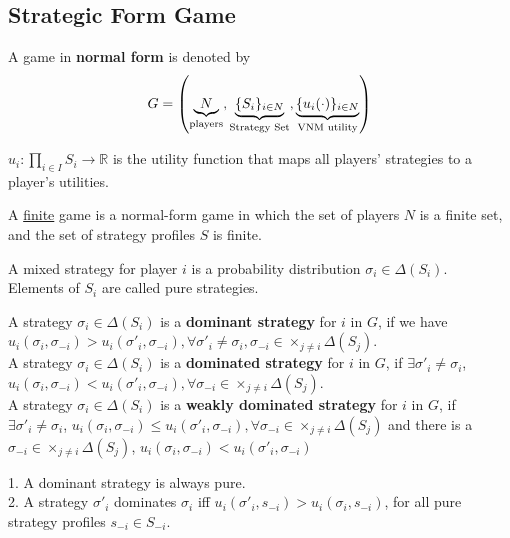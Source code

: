 \documentclass[11pt]{elegantbook_2}
\begin{document}
\subsection{Strategic Form Game}
\begin{definition}
    A game in \textbf{normal form} is denoted by $$G =\left(\underbrace{N}_{\textnormal{players}},\underbrace{\{S_i\}_{i\in N}}_{\textnormal{Strategy Set}},\underbrace{\{u_i(\cdot)\}_{i\in N}}_{\textnormal{VNM utility}}\right)$$

    $u_i:\prod_{i\in I}S_i \rightarrow \mathbb{R}$ is the utility function that maps all players' strategies to a player's utilities.

    A \underline{finite} game is a normal-form game in which the set of players $N$ is a finite set, and the set of strategy profiles $S$ is finite.
\end{definition}

\begin{definition}
A mixed strategy  for player $i$ is a probability distribution $\sigma_i\in\Delta(S_i)$.\\
Elements of $S_i$ are called pure strategies.
\end{definition}

\begin{definition}
    A strategy $\sigma_i\in \Delta(S_i)$ is a \textbf{dominant strategy} for $i$ in $G$, if we have $u_i(\sigma_i,\sigma_{-i})> u_i(\sigma'_i,\sigma_{-i}), \forall \sigma'_i\neq \sigma_i, \sigma_{-i}\in\times_{j\neq i}\Delta(S_j)$.\\
    A strategy $\sigma_i\in \Delta(S_i)$ is a \textbf{dominated strategy} for $i$ in $G$, if $\exists \sigma'_i\neq \sigma_i$, $u_i(\sigma_i,\sigma_{-i})<u_i(\sigma'_i,\sigma_{-i}), \forall \sigma_{-i}\in\times_{j\neq i}\Delta(S_j)$.\\
    A strategy $\sigma_i\in \Delta(S_i)$ is a \textbf{weakly dominated strategy} for $i$ in $G$, if $\exists \sigma'_i\neq \sigma_i$, $u_i(\sigma_i,\sigma_{-i})\leq u_i(\sigma'_i,\sigma_{-i}), \forall \sigma_{-i}\in\times_{j\neq i}\Delta(S_j)$ and there is a $\sigma_{-i}\in\times_{j\neq i}\Delta(S_j)$, $u_i(\sigma_i,\sigma_{-i})< u_i(\sigma'_i,\sigma_{-i})$
\end{definition}

\begin{lemma}
    1. A dominant strategy is always pure.\\
    2. A strategy $\sigma'_i$ dominates $\sigma_i$ iff $u_i(\sigma'_i,s_{-i})> u_i(\sigma_i,s_{-i})$, for all pure strategy profiles $s_{-i}\in S_{-i}$.
\end{lemma}
\end{document}
